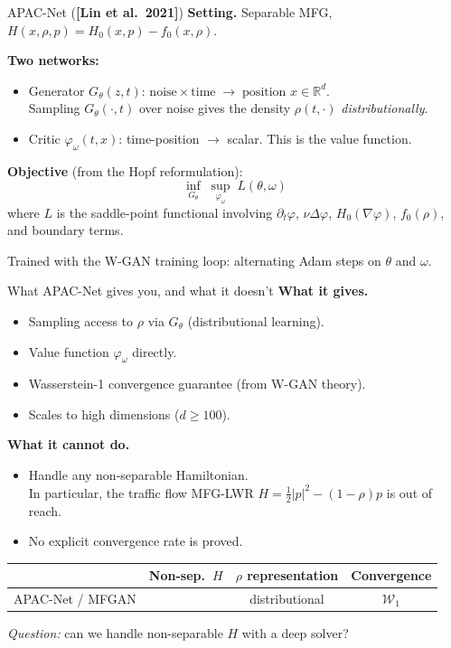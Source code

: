 \documentclass[10pt,aspectratio=169]{beamer}
\newcommand{\xmark}{\textcolor{accent}{\ding{55}}}
\newcommand{\R}{\mathbb{R}}
\newcommand{\W}{\mathcal{W}}
\newcommand{\teal}[1]{\textcolor{kaustteal}{#1}}
\newcommand{\blue}[1]{\textcolor{kaustblue}{#1}}
\newcommand{\citehl}[1]{\textcolor{kaustblue!80!black}{\textbf{[#1]}}}
\begin{document}
\begin{frame}{APAC-Net \;\textnormal{(\citehl{Lin et al.\ 2021})}}
\textbf{Setting.}  Separable MFG, $H(x,\rho,p) = H_0(x,p) - f_0(x,\rho)$.

\medskip
\textbf{Two networks:}
\smallskip
\begin{itemize}\setlength\itemsep{2pt}
  \item \blue{Generator} $G_\theta(z,t)$:
        $\text{noise} \times \text{time} \;\to\; \text{position } x \in \R^d$.\\
        Sampling $G_\theta(\cdot,t)$ over noise gives the density
        $\rho(t,\cdot)$ \emph{distributionally}.
  \item \teal{Critic} $\varphi_\omega(t,x)$: time-position $\to$ scalar.
        This is the value function.
\end{itemize}

\medskip
\textbf{Objective} (from the Hopf reformulation):
\[
  \inf_{G_\theta}\;\sup_{\varphi_\omega}\;
  L(\theta,\omega)
\]
where $L$ is the saddle-point functional involving $\partial_t\varphi$,
$\nu\Delta\varphi$, $H_0(\nabla\varphi)$, $f_0(\rho)$, and boundary terms.

\medskip
\teal{Trained with the W-GAN training loop: alternating Adam steps on $\theta$ and $\omega$.}
\end{frame}

\begin{frame}{What APAC-Net gives you, and what it doesn't}
\textbf{What it gives.}
\begin{itemize}\setlength\itemsep{1pt}
  \item Sampling access to $\rho$ via $G_\theta$ (\teal{distributional} learning).
  \item Value function $\varphi_\omega$ directly.
  \item \blue{Wasserstein-1 convergence guarantee} (from W-GAN theory).
  \item Scales to high dimensions ($d \geq 100$).
\end{itemize}


\textbf{What it cannot do.}
\begin{itemize}\setlength\itemsep{1pt}
  \item Handle any non-separable Hamiltonian. \xmark\\
        In particular, the traffic flow MFG-LWR
        $H=\tfrac12|p|^2-(1-\rho)p$ is \alert{out of reach}.
  \item No explicit convergence rate is proved.
\end{itemize}

\begin{recap}[title=The state of the art, before MFDGM]
\begin{tabular}{lccc}
& Non-sep.\ $H$ & $\rho$ representation & Convergence \\
\midrule
APAC-Net / MFGAN & \xmark & \teal{distributional} & $\W_1$ \\
\end{tabular}

\medskip
\emph{Question:} can we handle non-separable $H$ with a deep solver?
\end{recap}
\end{frame}
\end{document}
